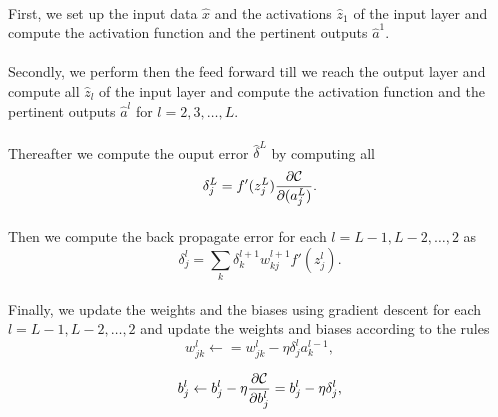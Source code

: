 \paragraph{}
First, we set up the input data $\hat{x}$ and the activations
$\hat{z}_1$ of the input layer and compute the activation function and
the pertinent outputs $\hat{a}^1$.




\paragraph{}
Secondly, we perform then the feed forward till we reach the output
layer and compute all $\hat{z}_l$ of the input layer and compute the
activation function and the pertinent outputs $\hat{a}^l$ for
$l=2,3,\dots,L$.




\paragraph{}
Thereafter we compute the ouput error $\hat{\delta}^L$ by computing all
\[
\delta_j^L = f'(z_j^L)\frac{\partial {\cal C}}{\partial (a_j^L)}.
\]




\paragraph{}
Then we compute the back propagate error for each $l=L-1,L-2,\dots,2$ as
\[
\delta_j^l = \sum_k \delta_k^{l+1}w_{kj}^{l+1}f'(z_j^l).
\]




\paragraph{}
Finally, we update the weights and the biases using gradient descent for each $l=L-1,L-2,\dots,2$ and update the weights and biases according to the rules
\[
w_{jk}^l\leftarrow  = w_{jk}^l- \eta \delta_j^la_k^{l-1},
\]

\[
b_j^l \leftarrow b_j^l-\eta \frac{\partial {\cal C}}{\partial b_j^l}=b_j^l-\eta \delta_j^l,
\]



